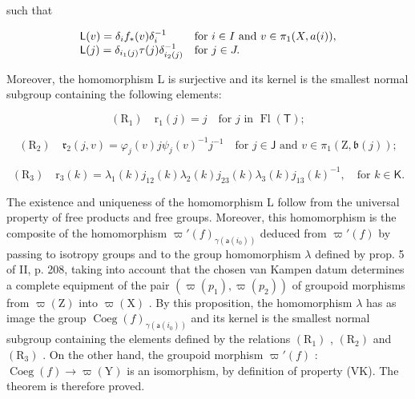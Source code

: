 such that

\[
\begin{array}{l l} \mathsf {L} (v) = \delta_ {i} f _ {*} (v) \delta_ {i} ^ {- 1} & \text {for } i\in I \text { and } v\in\pi_{1} (X,a(i)), \\ \mathsf {L} (j) = \delta_ {i _ {1} (j)} \tau (j) \delta_ {i _ {2} (j)} ^ {- 1} & \text {for } j\in J. \end{array}
\]

Moreover, the homomorphism L is surjective and its kernel is the smallest normal subgroup containing the following elements:

\[
\left(\mathrm{R} _ {1}\right) \quad \mathrm{r} _ {1} (j) = j \quad \text {for } j \text { in } \operatorname{Fl} (\mathsf {T});
\]

\[
\left(\mathrm{R} _ {2}\right) \quad \mathfrak {r} _ {2} (j, v) = \varphi_ {j} (v) j \psi_ {j} (v) ^ {- 1} j ^ {- 1} \quad \text {for } j \in \mathsf {J} \text { and } v \in \pi_ {1} (\mathrm{Z}, \mathfrak {b} (j));
\]

\[
\left(\mathrm{R} _ {3}\right) \quad \mathrm{r} _ {3} (k) = \lambda_ {1} (k) j _ {1 2} (k) \lambda_ {2} (k) j _ {2 3} (k) \lambda_ {3} (k) j _ {1 3} (k) ^ {- 1}, \quad \text {for } k \in \mathsf {K}.
\]

The existence and uniqueness of the homomorphism L follow from the universal property of free products and free groups. Moreover, this homomorphism is the composite of the homomorphism \(\varpi'(f)_{\gamma(\mathsf{a}(i_0))}\) deduced from \(\varpi'(f)\) by passing to isotropy groups and to the group homomorphism \(\lambda\) defined by prop. 5 of II, p. 208, taking into account that the chosen van Kampen datum determines a complete equipment of the pair \((\varpi(p_1), \varpi(p_2))\) of groupoid morphisms from \(\varpi(\mathrm{Z})\) into \(\varpi(\mathrm{X})\) . By this proposition, the homomorphism \(\lambda\) has as image the group \(\operatorname{Coeg}(f)_{\gamma(\mathsf{a}(i_0))}\) and its kernel is the smallest normal subgroup containing the elements defined by the relations \((\mathrm{R}_1)\) , \((\mathrm{R}_2)\) and \((\mathrm{R}_3)\) . On the other hand, the groupoid morphism \(\varpi'(f)\) : \(\operatorname{Coeg}(f) \to \varpi(\mathrm{Y})\) is an isomorphism, by definition of property (VK). The theorem is therefore proved.

